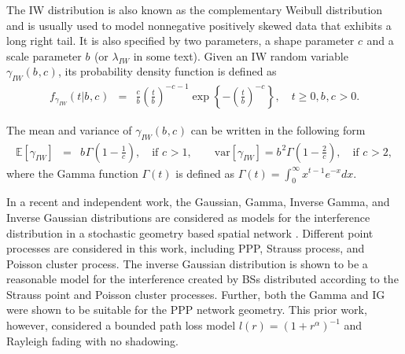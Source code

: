 \documentclass[12pt, draftclsnofoot, onecolumn]{IEEEtran}
\theoremstyle{plain}
\begin{document}
The IW distribution is also known as the complementary Weibull distribution and is usually used to model nonnegative positively skewed data that exhibits a long right tail. It is also specified by two parameters, a shape parameter ${{c_{}}}$ and a scale parameter ${{b_{}}}$ (or $\lambda_{IW}$ in some text). Given an IW random variable $\gamma_{IW}({{b_{}}},{{c_{}}})$, %
its probability density function is defined as \cite{IW1rinne2008weibull,IW2sultan2014bayesian}\vspace{-.1in}
\begin{eqnarray}
f_{\gamma_{IW}}(t|{{b_{}}},{{c_{}}})&\!\!\!=&\!\!\! \frac{{{c_{}}}}{{{b_{}}}} \left( \frac{t}{{{b_{}}}}\right)^{-{{c_{}}}-1}  \exp \left\{- \left(\frac{t}{{{b_{}}}} \right)^{-{{c_{}}}}\right\}, \quad t \geq 0, {{b_{}}}, {{c_{}}}>0. \label{f_IW1}%
\end{eqnarray}

The mean and variance of $\gamma_{IW}({{b_{}}},{{c_{}}})$ can be written in the following form \cite{IW1rinne2008weibull} \vspace{-.1in}
\begin{eqnarray}\label{Param1b}
\mathbb{E}[\gamma_{IW}]&=&{{b_{}}} \Gamma(1-\frac{1}{{{c_{}}}}), \quad  \text{if } {{c_{}}}>1, \quad \quad
\text{var}[\gamma_{IW}]={{b_{}}}^2 \Gamma(1-\frac{2}{{{c_{}}}}),\quad  \text{if } {{c_{}}}>2,
\end{eqnarray}
where the Gamma function $\Gamma(t)$ is defined as
$\Gamma(t)=\int_{0}^{\infty} x^{t-1}e^{-x}dx$.
%

In a recent and independent work, the Gaussian, Gamma, Inverse Gamma, and Inverse Gaussian distributions are considered as models for the interference distribution in a stochastic geometry based spatial network \cite{kountouris2014approximating}. Different point processes are considered in this work, including PPP, Strauss process, and Poisson cluster process. 
The inverse Gaussian distribution is shown to be a reasonable model for the interference created by BSs distributed according to the Strauss point and Poisson cluster processes. Further, both the Gamma and IG were shown to be suitable for the PPP network geometry. This prior work, however, considered a bounded path loss model $l(r)=(1+r^\alpha)^{-1}$ and Rayleigh fading with no shadowing.  
\end{document}
